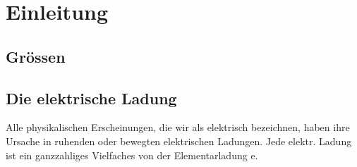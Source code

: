 \newpage
\section{Einleitung}
\subsection{Grössen}


\subsection{Die elektrische Ladung}
Alle physikalischen Erscheinungen, die wir als elektrisch bezeichnen, haben ihre Ursache in
ruhenden oder bewegten elektrischen Ladungen. Jede elektr. Ladung ist ein ganzzahliges Vielfaches von der Elementarladung e. 
\linebreak

